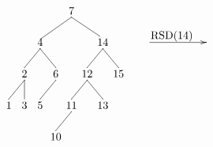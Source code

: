 \documentclass[10pt,a4paper,spanish]{report}
\begin{document}
\begin{minipage}{0.5\textwidth}
\[\begin{xy}
,(32,-8)*+=<20mm>[]\txt<2cm>{RSD(14)}
,(0,0)*+=<10mm>[]\txt<2cm>{7}
,(-10,-10)*+=<10mm>[]\txt<2cm>{4}
,(10,-10)*+=<10mm>[]\txt<2cm>{14}
,(-15,-20)*+=<10mm>[]\txt<2cm>{2}
,(-5,-20)*+=<10mm>[]\txt<2cm>{6}
,(5,-20)*+=<10mm>[]\txt<2cm>{12}
,(15,-20)*+=<10mm>[]\txt<2cm>{15}
,(-20,-30)*+=<10mm>[]\txt<2cm>{1}
,(-15,-30)*+=<10mm>[]\txt<2cm>{3}
,(-10,-30)*+=<10mm>[]\txt<2cm>{5}
,(0,-30)*+=<10mm>[]\txt<2cm>{11}
,(10,-30)*+=<10mm>[]\txt<2cm>{13}
,(-5,-40)*+=<10mm>[]\txt<2cm>{10}

\ar@{->} (25,-10);(43,-10)
\ar@{-} (0,-2);(-10,-9) %
\ar@{-} (0,-2);(9,-8) %
\ar@{-} (-10,-12);(-15,-18) %
\ar@{-} (10,-12);(5,-18) %
\ar@{-} (10,-12);(15,-18) %
\ar@{-} (-15,-22);(-20,-28)
\ar@{-} (-15,-22);(-15,-28)
\ar@{-} (-10,-12);(-5,-18) %
\ar@{-} (-5,-22);(-10,-28) %
\ar@{-} (5,-22);(0,-28)
\ar@{-} (0,-32);(-5,-38)
\ar@{-} (5,-22);(10,-28)
\end{xy}\]
\end{minipage}
\end{document}
